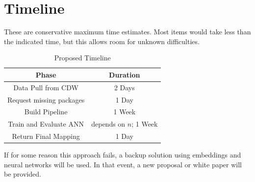 \documentclass[12pt]{article}
\begin{document}
\section{Timeline}\label{sec:timeline}
These are conservative maximum time estimates. Most items would take less than the indicated time, but this allows room for unknown difficulties.
\begin{table}[h]
    \centering
    \begin{tabular}{|c|c|}
        \hline
        Phase & Duration \\
        \hline
        Data Pull from CDW & 2 Days \\
        Request missing packages & 1 Day \\
        Build Pipeline & 1 Week \\
        Train and Evaluate ANN & depends on $n$; 1 Week \\
        Return Final Mapping & 1 Day\\
        \hline
    \end{tabular}
    \caption{Proposed Timeline}
    \label{tab:timeline}
\end{table}

If for some reason this approach fails, a backup solution using embeddings and neural networks will be used. In that event, a new proposal or white paper will be provided.  

\newpage
\nocite{*}
\printbibliography
\end{document}
